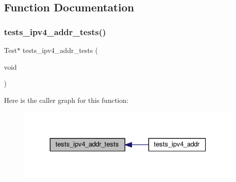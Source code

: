 \subsection{Function Documentation}
\mbox{\label{tests-ipv4__addr_8c_a7a782d342eb3ca2850cd4e091d7b27d7}} 
\subsubsection{\texorpdfstring{tests\+\_\+ipv4\+\_\+addr\+\_\+tests()}{tests\_ipv4\_addr\_tests()}}
{\footnotesize\ttfamily Test$\ast$ tests\+\_\+ipv4\+\_\+addr\+\_\+tests (\begin{DoxyParamCaption}\item[{void}]{ }\end{DoxyParamCaption})}

Here is the caller graph for this function\+:
\nopagebreak
\begin{figure}[H]
\begin{center}
\leavevmode
\includegraphics[width=315pt]{tests-ipv4__addr_8c_a7a782d342eb3ca2850cd4e091d7b27d7_icgraph}
\end{center}
\end{figure}
